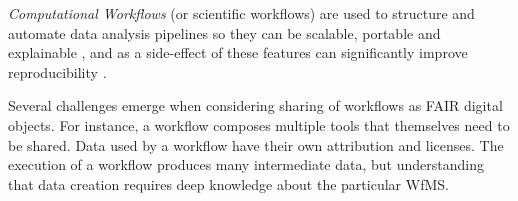 \emph{Computational Workflows} (or \glspl{scientific workflow}) are used to structure and automate data analysis pipelines so they can be scalable, portable and explainable \cite{Atkinson 2017}, and as a side-effect of these features can significantly improve reproducibility \cite{Cohen-Boulakia 2017}. 

Several challenges emerge when considering sharing of workflows as FAIR digital objects. For instance, a workflow composes multiple tools that themselves need to be shared. Data used by a workflow have their own attribution and licenses. The execution of a workflow produces many intermediate data, but understanding that data creation requires deep knowledge about the particular \acrfull{WfMS}.



